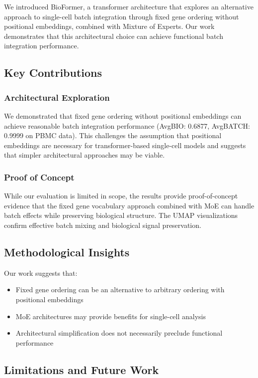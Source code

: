 We introduced BioFormer, a transformer architecture that explores an alternative approach to single-cell batch integration through fixed gene ordering without positional embeddings, combined with Mixture of Experts. Our work demonstrates that this architectural choice can achieve functional batch integration performance.

\subsection{Key Contributions}

\subsubsection{Architectural Exploration}
We demonstrated that fixed gene ordering without positional embeddings can achieve reasonable batch integration performance (AvgBIO: 0.6877, AvgBATCH: 0.9999 on PBMC data). This challenges the assumption that positional embeddings are necessary for transformer-based single-cell models and suggests that simpler architectural approaches may be viable.

\subsubsection{Proof of Concept}
While our evaluation is limited in scope, the results provide proof-of-concept evidence that the fixed gene vocabulary approach combined with MoE can handle batch effects while preserving biological structure. The UMAP visualizations confirm effective batch mixing and biological signal preservation.

\subsection{Methodological Insights}
Our work suggests that:
\begin{itemize}
\item Fixed gene ordering can be an alternative to arbitrary ordering with positional embeddings
\item MoE architectures may provide benefits for single-cell analysis
\item Architectural simplification does not necessarily preclude functional performance
\end{itemize}

\subsection{Limitations and Future Work}

